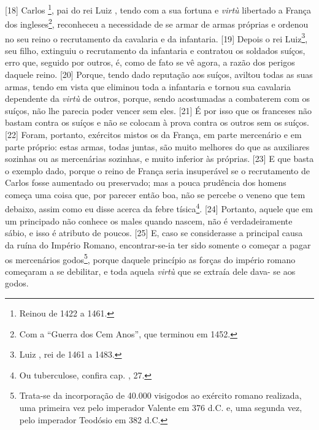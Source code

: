 {[}18{]} Carlos \footnote{Reinou de 1422 a 1461.}, pai do rei Luiz
, tendo com a sua fortuna e \emph{virtù} libertado a França dos
ingleses\footnote{Com a ``Guerra dos Cem Anos'', que terminou em 1452.},
reconheceu a necessidade de se armar de armas próprias e ordenou no seu
reino o recrutamento da cavalaria e da infantaria. {[}19{]} Depois o rei
Luiz\footnote{Luiz , rei de 1461 a 1483.}, seu filho, extinguiu o
recrutamento da infantaria e contratou os soldados suíços, erro que,
seguido por outros, é, como de fato se vê agora, a razão dos perigos
daquele reino. {[}20{]} Porque, tendo dado reputação aos suíços, aviltou
todas as suas armas, tendo em vista que eliminou toda a infantaria e
tornou sua cavalaria dependente da \emph{virtù} de outros, porque, sendo
acostumadas a combaterem com os suíços, não lhe parecia poder vencer sem
eles. {[}21{]} É por isso que os franceses não bastam contra os suíços e
não se colocam à prova contra os outros sem os suíços. {[}22{]} Foram,
portanto, exércitos mistos os da França, em parte mercenário e em parte
próprio: estas armas, todas juntas, são muito melhores do que as
auxiliares sozinhas ou as mercenárias sozinhas, e muito inferior às
próprias. {[}23{]} E que basta o exemplo dado, porque o reino de França
seria insuperável se o recrutamento de Carlos fosse aumentado ou
preservado; mas a pouca prudência dos homens começa uma coisa que, por
parecer então boa, não se percebe o veneno que tem debaixo, assim como
eu disse acerca da febre tísica\footnote{Ou tuberculose, confira cap.
  , 27.}. {[}24{]} Portanto, aquele que em um principado não conhece
os males quando nascem, não é verdadeiramente sábio, e isso é atributo
de poucos. {[}25{]} E, caso se considerasse a principal causa da ruína
do Império Romano, encontrar-se-ia ter sido somente o começar a pagar os
mercenários godos\footnote{Trata-se da incorporação de 40.000 visigodos
  ao exército romano realizada, uma primeira vez pelo imperador Valente
  em 376 d.C. e, uma segunda vez, pelo imperador Teodósio em 382 d.C.},
porque daquele princípio as forças do império romano começaram a se
debilitar, e toda aquela \emph{virtù} que se extraía dele dava- se aos
godos.

